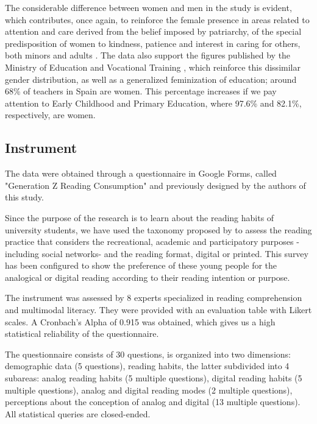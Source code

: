 \documentclass[english]{textolivre}
\begin{document}
The considerable difference between women and men in the study is evident, which contributes, once again, to reinforce the female presence in areas related to attention and care derived from the belief imposed by patriarchy, of the special predisposition of women to kindness, patience and interest in caring for others, both minors and adults \cite{albisetti_schooling_1989, preston_domestic_1993}. The data also support the figures published by the Ministry of Education and Vocational Training \cite{ministerioeducacion2022}, which reinforce this dissimilar gender distribution, as well as a generalized feminization of education; around 68\% of teachers in Spain are women. This percentage increases if we pay attention to Early Childhood and Primary Education, where 97.6\% and 82.1\%, respectively, are women. 



\subsection{Instrument}
The data were obtained through a questionnaire in Google Forms, called "Generation Z Reading Consumption" and previously designed by the authors of this study.

Since the purpose of the research is to learn about the reading habits of university students, we have used the taxonomy proposed by \textcite{mckenna_reading_2012} to assess the reading practice that considers the recreational, academic and participatory purposes -including social networks- and the reading format, digital or printed. This survey has been configured to show the preference of these young people for the analogical or digital reading according to their reading intention or purpose.

The instrument was assessed by 8 experts specialized in reading comprehension and multimodal literacy. They were provided with an evaluation table with Likert scales. A Cronbach's Alpha of 0.915 was obtained, which gives us a high statistical reliability of the questionnaire.

The questionnaire consists of 30 questions, is organized into two dimensions: demographic data (5 questions), reading habits, the latter subdivided into 4 subareas: analog reading habits (5 multiple questions), digital reading habits (5 multiple questions), analog and digital reading modes (2 multiple questions), perceptions about the conception of analog and digital (13 multiple questions). All statistical queries are closed-ended. 
\end{document}
